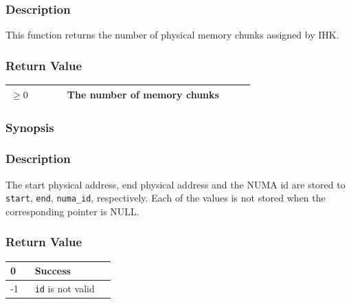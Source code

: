 \documentclass[twoside,11pt,fleqn]{book}
\begin{document}
\subsubsection*{Description}{\quad}
This function returns the number of physical memory chunks assigned by IHK.

\subsubsection*{Return Value}{\quad}
\begin{table}[!h]
\footnotesize
\begin{tabular}{|p{0.20\linewidth}|p{0.66\linewidth}|} \hline
$\ge 0$&The number of memory chunks\\ \hline
\end{tabular}
\vspace{-0em}
\end{table}
\FloatBarrier

\subsubsection{}
\subsubsection*{Synopsis}{\quad}

\subsubsection*{Description}{\quad}
The start physical address, end physical address and the NUMA id are stored to \texttt{start}, \texttt{end}, \texttt{numa\_id}, respectively. Each of the values is not stored when the corresponding pointer is NULL.

\subsubsection*{Return Value}{\quad}
\begin{table}[!h]
\footnotesize
\begin{tabular}{|p{0.20\linewidth}|p{0.66\linewidth}|} \hline
0&Success\\ \hline
-1&\texttt{id} is not valid\\ \hline
\end{tabular}
\vspace{-0em}
\end{table}
\FloatBarrier
\end{document}
